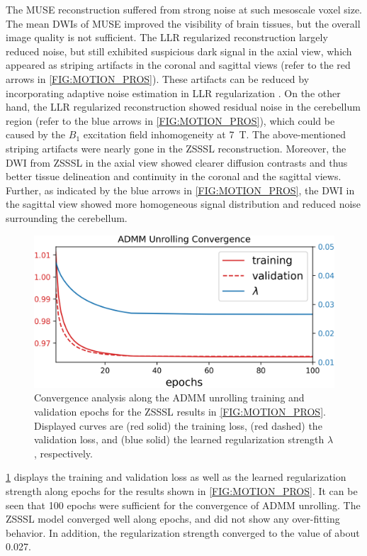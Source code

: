 \documentclass[journal,twoside,web]{ieeecolor}
\begin{document}
	The MUSE reconstruction suffered from strong noise
	at such mesoscale voxel size. 
	The mean DWIs of MUSE improved the visibility of brain tissues, 
	but the overall image quality is not sufficient.
	The LLR regularized reconstruction largely reduced noise,
	but still exhibited suspicious dark signal in the axial view,
	which appeared as striping artifacts in the coronal and sagittal views
	(refer to the red arrows in \cref{FIG:MOTION_PROS}).
	These artifacts can be reduced by incorporating adaptive noise estimation
	in LLR regularization \cite{cordero_2019_cplxdwi}.
	On the other hand, the LLR regularized reconstruction
	showed residual noise in the cerebellum region
	(refer to the blue arrows in \cref{FIG:MOTION_PROS}),
	which could be caused by the $B_1$ excitation field inhomogeneity
	at \SI{7}{\tesla}.
	The above-mentioned striping artifacts were nearly gone 
	in the ZSSSL reconstruction.
	Moreover, the DWI from ZSSSL in the axial view 
	showed clearer diffusion contrasts 
	and thus better tissue delineation and continuity 
	in the coronal and the sagittal views.
	Further, as indicated by the blue arrows in \cref{FIG:MOTION_PROS},
	the DWI in the sagittal view showed more homogeneous
	signal distribution and reduced noise surrounding the cerebellum.

	\begin{figure}
		\centering
		\includegraphics[width=\columnwidth]{../figures/fig5.png}
		\caption{Convergence analysis along the ADMM unrolling training
			and validation epochs
			for the ZSSSL results in \cref{FIG:MOTION_PROS}.
			Displayed curves are (red solid) the training loss,
			(red dashed) the validation loss,
			and (blue solid) the learned regularization strength $\lambda$, respectively.}
		\label{FIG:CONVERGENCE}
	\end{figure}

	\cref{FIG:CONVERGENCE} displays the training and validation loss
	as well as the learned regularization strength along epochs 
	for the results shown in \cref{FIG:MOTION_PROS}.
	It can be seen that 100 epochs were sufficient for
	the convergence of ADMM unrolling. 
	The ZSSSL model converged well along epochs, 
	and did not show any over-fitting behavior.
	In addition, the regularization strength converged
	to the value of about 0.027.
\end{document}
